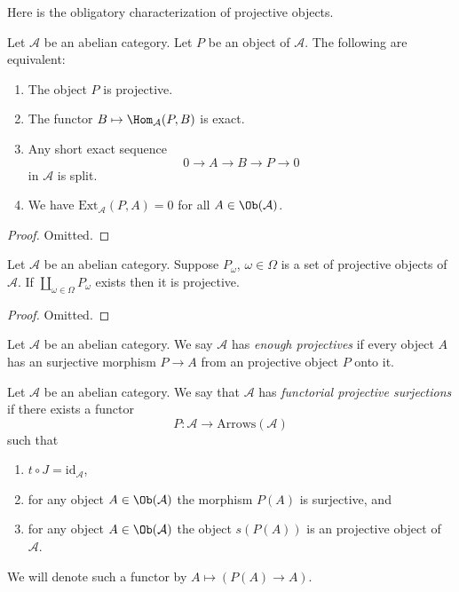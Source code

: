 \noindent
Here is the obligatory characterization of projective objects.

\begin{lemma}
\label{lemma-characterize-projectives}
Let $\mathcal{A}$ be an abelian category.
Let $P$ be an object of $\mathcal{A}$.
The following are equivalent:
\begin{enumerate}
\item The object $P$ is projective.
\item The functor $B \mapsto \Hom_\mathcal{A}(P, B)$
is exact.
\item Any short exact sequence
$$
0 \to A \to B \to P \to 0
$$
in $\mathcal{A}$ is split.
\item We have $\text{Ext}_\mathcal{A}(P, A) = 0$ for
all $A \in \Ob(\mathcal{A})$.
\end{enumerate}
\end{lemma}

\begin{proof}
Omitted.
\end{proof}

\begin{lemma}
\label{lemma-coproduct-projectives}
Let $\mathcal{A}$ be an abelian category.
Suppose $P_\omega$, $\omega \in \Omega$ is a set of projective
objects of $\mathcal{A}$. If $\coprod_{\omega \in \Omega} P_\omega$
exists then it is projective.
\end{lemma}

\begin{proof}
Omitted.
\end{proof}

\begin{definition}
\label{definition-enough-projectives}
Let $\mathcal{A}$ be an abelian category.
We say $\mathcal{A}$ has {\it enough projectives}
if every object $A$ has an surjective morphism
$P \to A$ from an projective object $P$ onto it.
\end{definition}

\begin{definition}
\label{definition-functorial-projective-surjections}
Let $\mathcal{A}$ be an abelian category.
We say that $\mathcal{A}$ has {\it functorial projective surjections}
if there exists a functor
$$
P : \mathcal{A} \longrightarrow \text{Arrows}(\mathcal{A})
$$
such that
\begin{enumerate}
\item $t \circ J = \text{id}_\mathcal{A}$,
\item for any object $A \in \Ob(\mathcal{A})$
the morphism $P(A)$ is surjective, and
\item for any object $A \in \Ob(\mathcal{A})$
the object $s(P(A))$ is an projective object of $\mathcal{A}$.
\end{enumerate}
We will denote such a functor by
$A \mapsto (P(A) \to A)$.
\end{definition}

















